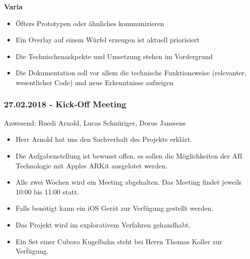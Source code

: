 \textbf{Varia}
\begin{itemize}
	\item Öfters Prototypen oder ähnliches kommunizieren
	\item Ein Overlay auf einem Würfel erzeugen ist aktuell priorisiert
	\item Die Technischenaskpekte und Umsetzung stehen im Vordergrund
	\item Die Dokumentation soll vor allem die technische Funktionsweise (relevanter, wesentlicher Code) und neue Erkenntnisse aufzeigen
\end{itemize}

\subsubsection*{27.02.2018 - Kick-Off Meeting}

Anwesend: Ruedi Arnold, Lucas Schnüriger, Dorus Janssens

\begin{itemize}
	\item Herr Arnold hat uns den Sachverhalt des Projekts erklärt.
	\item Die Aufgabenstellung ist bewusst offen, es sollen die Möglichkeiten der AR Technologie mit Apples ARKit ausgelotet werden.
	\item Alle zwei Wochen wird ein Meeting abgehalten. Das Meeting findet jeweils 10:00 bis 11:00 statt.
	\item Falls benötigt kann ein iOS Gerät zur Verfügung gestellt werden.
	\item Das Projekt wird im explorativem Verfahren gehandhabt.
	\item Ein Set einer Cuboro Kugelbahn steht bei Herrn Thomas Koller zur Verfügung.
\end{itemize}

